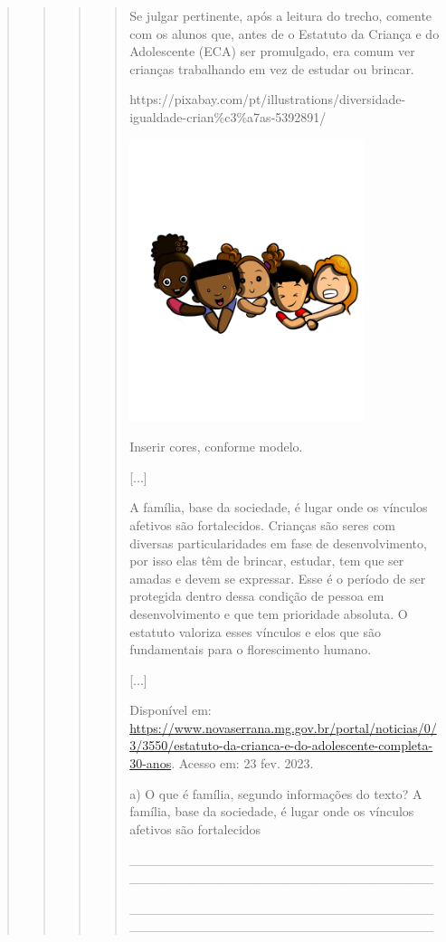 \begin{quote}
\begin{quote}
\begin{quote}
\begin{quote}
Se julgar pertinente, após a leitura do trecho, comente com os alunos
que, antes de o Estatuto da Criança e do Adolescente (ECA) ser
promulgado, era comum ver crianças trabalhando em vez de estudar ou
brincar.

https://pixabay.com/pt/illustrations/diversidade-igualdade-crian\%c3\%a7as-5392891/

\includegraphics[width=2.70833in,height=3.25006in]{media/image27.png}

Inserir cores, conforme modelo.

{[}...{]}

A família, base da sociedade, é lugar onde os vínculos afetivos são
fortalecidos. Crianças são seres com diversas particularidades em fase
de desenvolvimento, por isso elas têm de brincar, estudar, tem que ser
amadas e devem se expressar. Esse é o período de ser protegida dentro
dessa condição de pessoa em desenvolvimento e que tem prioridade
absoluta. O estatuto valoriza esses vínculos e elos que são fundamentais
para o florescimento humano.

{[}...{]}

Disponível em:
\url{https://www.novaserrana.mg.gov.br/portal/noticias/0/3/3550/estatuto-da-crianca-e-do-adolescente-completa-30-anos}.
Acesso em: 23 fev. 2023.

a) O que é família, segundo informações do texto? A família, base da
sociedade, é lugar onde os vínculos afetivos são fortalecidos

\_\_\_\_\_\_\_\_\_\_\_\_\_\_\_\_\_\_\_\_\_\_\_\_\_\_\_\_\_\_\_\_\_\_\_\_\_\_\_\_\_\_\_\_\_\_\_\_\_\_\_\_\_\_\_\_\_\_\_\_\_\_\_\_

\_\_\_\_\_\_\_\_\_\_\_\_\_\_\_\_\_\_\_\_\_\_\_\_\_\_\_\_\_\_\_\_\_\_\_\_\_\_\_\_\_\_\_\_\_\_\_\_\_\_\_\_\_\_\_\_\_\_\_\_\_\_\_\_


\end{quote}
\end{quote}
\end{quote}
\end{quote}
